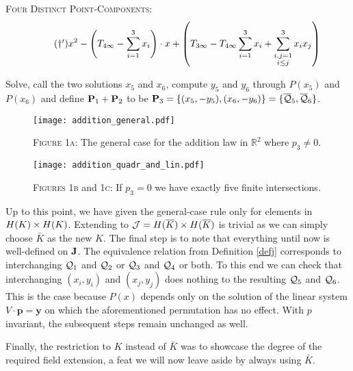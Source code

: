 \documentclass[english,11pt,a4paper]{article}
\begin{document}
\begin{case} {\scshape Four Distinct Point-Components:}
  \vspace{-2mm}
  \fline
  \begin{align*}
    \label{daggerp} \tag{$\dagger '$} x^2 - \left( T_{4\infty} - \sumthr \right) \cdot x + \left(T_{3\infty} - T_{4\infty} \sumthr + \sum_{\substack{i,j=1\\i\leq j}}^3 x_i x_j \right)
  \end{align*}
  \fline

  Solve, call the two solutions $x_5$ and $x_6$, compute $y_5$ and $y_6$ through $P(x_5)$ and $P(x_6)$ and define $\P_1+\P_2$ to be $\P_3=\{ (x_5,-y_5) , (x_6,-y_6) \}=\{ \bar \q_5, \bar \q_6 \}$.
\end{case}


\begin{figure}[ht!]
  \fline
  \begin{center}
    \vspace{1mm}
    \texttt{[image: addition\_general.pdf]}

    {\scshape Figure 1a}: The general case for the addition law in $\mathds{R}^2$ where $p_3 \neq 0$.

    \vspace{1mm}

    \texttt{[image: addition\_quadr\_and\_lin.pdf]}

    {\scshape Figures 1b} and {\scshape 1c}: If $p_3 = 0$ we have exactly five finite intersections.
  \end{center}
  \vspace{-1.5mm}
  \fline
\end{figure}


\begin{remark}
  Up to this point, we have given the general-case rule only for elements in $\ek \times \ek$. Extending to $\j = \ekb \times \ekb$ is trivial as we can simply choose $\bar K$ as the new $K$. The final step is to note that everything until now is well-defined on $\J$. The equivalence relation from Definition \ref{defj} corresponds to interchanging $\q_1$ and $\q_2$ or $\q_3$ and $\q_4$ or both.
  To this end we can check that interchanging $(x_i,y_i)$ and $(x_j,y_j)$ does nothing to the resulting $\q_5$ and $\q_6$. This is the case because $P(x)$ depends only on the solution of the linear system $V \cdot \mathbf{p} = \mathbf{y}$ on which the aforementioned permutation has no effect. With $p$ invariant, the subsequent steps remain unchanged as well.

  Finally, the restriction to $K$ instead of $\bar K$ was to showcase the degree of the required field extension, a feat we will now leave aside by always using $\bar K$.
\end{remark}
\end{document}
